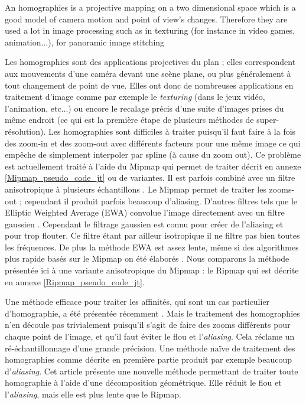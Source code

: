 
An homographies is a projective mapping on a two dimensional space which is a good model of camera motion and point of view's changes. Therefore they are used a lot in image processing such as in texturing \cite{heckbert1983texture} (for instance in video games, animation...), for panoramic image stitching \cite{brown2007automatic}








Les homographies sont des applications projectives du plan ; elles correspondent aux mouvements d'une caméra devant une scène plane, ou plus généralement à tout changement de point de vue. Elles ont donc de nombreuses applications en traitement d'image comme par exemple le \emph{texturing} \cite{heckbert1983texture} (dans le jeux vidéo, l'animation, etc...) ou encore le recalage précis d'une suite d'images prises du même endroit \cite{brown2007automatic} (ce qui est la première étape de plusieurs méthodes de super-résolution). Les homographies sont difficiles à traiter puisqu'il faut faire à la fois des zoom-in et des zoom-out avec différents facteurs pour une même image ce qui empêche de simplement interpoler par spline (à cause du zoom out).  Ce problème est actuellement traité à l'aide du Mipmap qui permet de traiter \cite{williams1983pyramidal} décrit en annexe \ref{Mipmap_pseudo_code_jt} ou de variantes. Il est parfois combiné avec un filtre anisotropique à plusieurs échantillons  \cite{barkans1997high}. Le Mipmap permet de traiter les zooms-out ; cependant il produit parfois beaucoup d'aliasing.  D'autres filtres tels que le Elliptic Weighted Average (EWA) convolue l'image directement avec un filtre gaussien \cite{greene1986creating}. Cependant le filtrage gaussien est connu pour créer de l'aliasing et pour trop flouter. Ce filtre étant par ailleur isotropique il ne filtre pas bien toutes les fréquences. De plus la méthode EWA est assez lente, même si des algorithmes plus rapide basés sur le Mipmap on été élaborés \cite{mccormack1999feline,huttner1999fast}. Nous comparons la méthode présentée ici à une variante anisotropique du Mipmap : le Ripmap \cite{akenine2008real} qui est décrite en annexe \ref{Ripmap_pseudo_code_jt}.

	Une méthode efficace pour traiter les affinités, qui sont un cas particulier d'homographie, a été présentée récemment \cite{szeliski2010high}. Mais le traitement des homographies n'en découle pas trivialement puisqu'il s'agit de faire des zooms différents pour chaque point de l'image, et qu'il faut éviter le flou et l'\emph{aliasing}. Cela réclame un ré-échantillonnage d'une grande précision. Une méthode naïve de traitement des homographies comme décrite en première partie produit par exemple beaucoup d'\emph{aliasing}. Cet article présente une nouvelle méthode permettant de traiter toute homographie à l'aide d'une décomposition géométrique. Elle réduit le flou et l'\emph{aliasing}, mais elle est plus lente que le Ripmap.

